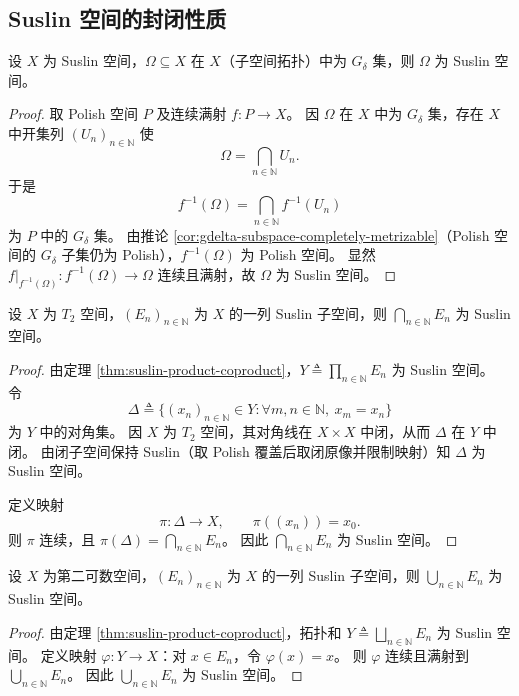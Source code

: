 \documentclass[lang=cn,a4paper,newtx,figureplace=section,tableplace=section]{elegantbook}
\begin{document}
\subsection{Suslin 空间的封闭性质}

\begin{proposition}\label{prop:suslin-gdelta}
  设 $X$ 为 Suslin 空间，$\Omega\subseteq X$ 在 $X$（子空间拓扑）中为 $G_\delta$ 集，则 $\Omega$ 为 Suslin 空间。
\end{proposition}
\begin{proof}
  取 Polish 空间 $P$ 及连续满射 $f:P\to X$。
  因 $\Omega$ 在 $X$ 中为 $G_\delta$ 集，存在 $X$ 中开集列 $(U_n)_{n\in\mathbb{N}}$ 使
  \[
    \Omega=\bigcap_{n\in\mathbb{N}}U_n.
  \]
  于是
  \[
    f^{-1}(\Omega)=\bigcap_{n\in\mathbb{N}}f^{-1}(U_n)
  \]
  为 $P$ 中的 $G_\delta$ 集。
  由推论 \ref{cor:gdelta-subspace-completely-metrizable}（Polish 空间的 $G_\delta$ 子集仍为 Polish），$f^{-1}(\Omega)$ 为 Polish 空间。
  显然 $f\vert_{f^{-1}(\Omega)}:f^{-1}(\Omega)\to\Omega$ 连续且满射，故 $\Omega$ 为 Suslin 空间。
\end{proof}

\begin{proposition}\label{prop:suslin-intersection}
  设 $X$ 为 $T_2$ 空间，$(E_n)_{n\in\mathbb{N}}$ 为 $X$ 的一列 Suslin 子空间，则 $\bigcap_{n\in\mathbb{N}}E_n$ 为 Suslin 空间。
\end{proposition}
\begin{proof}
  由定理 \ref{thm:suslin-product-coproduct}，$Y\triangleq\prod_{n\in\mathbb{N}}E_n$ 为 Suslin 空间。
  令
  \[
    \Delta\triangleq\{(x_n)_{n\in\mathbb{N}}\in Y: \forall m,n\in\mathbb{N},\ x_m=x_n\}
  \]
  为 $Y$ 中的对角集。
  因 $X$ 为 $T_2$ 空间，其对角线在 $X\times X$ 中闭，从而 $\Delta$ 在 $Y$ 中闭。
  由闭子空间保持 Suslin（取 Polish 覆盖后取闭原像并限制映射）知 $\Delta$ 为 Suslin 空间。

  定义映射
  \[
    \pi:\Delta\to X,\qquad \pi((x_n))=x_0.
  \]
  则 $\pi$ 连续，且 $\pi(\Delta)=\bigcap_{n\in\mathbb{N}}E_n$。
  因此 $\bigcap_{n\in\mathbb{N}}E_n$ 为 Suslin 空间。
\end{proof}

\begin{proposition}\label{prop:suslin-union}
  设 $X$ 为第二可数空间，$(E_n)_{n\in\mathbb{N}}$ 为 $X$ 的一列 Suslin 子空间，则 $\bigcup_{n\in\mathbb{N}}E_n$ 为 Suslin 空间。
\end{proposition}
\begin{proof}
  由定理 \ref{thm:suslin-product-coproduct}，拓扑和 $Y\triangleq\bigsqcup_{n\in\mathbb{N}}E_n$ 为 Suslin 空间。
  定义映射 $\varphi:Y\to X$：对 $x\in E_n$，令 $\varphi(x)=x$。
  则 $\varphi$ 连续且满射到 $\bigcup_{n\in\mathbb{N}}E_n$。
  因此 $\bigcup_{n\in\mathbb{N}}E_n$ 为 Suslin 空间。
\end{proof}
\end{document}
